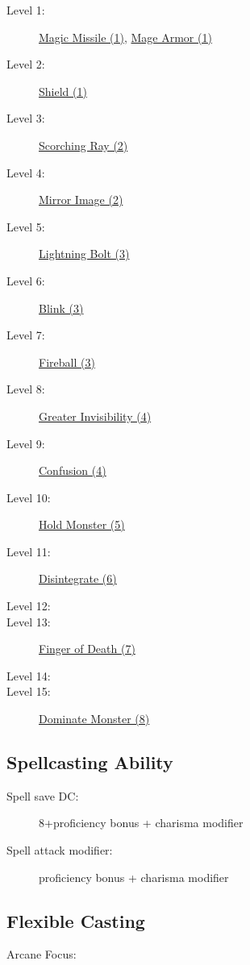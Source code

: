 \documentclass[letterpaper,10pt,twoside,twocolumn,openany]{book}
\begin{document}
\begin{description}
	\item[Level 1:] \hyperlink{Magic Missile}{Magic Missile (1)}, \hyperlink{Mage Armor}{Mage Armor (1)}
	\item[Level 2:] \hyperlink{Shield}{Shield (1)}
	\item[Level 3:] \hyperlink{Scorching Ray}{Scorching Ray (2)}	 
	\item[Level 4:] \hyperlink{Mirror Image}{Mirror Image (2)}
	\item[Level 5:] \hyperlink{Lightning Bolt}{Lightning Bolt (3)}
	\item[Level 6:] \hyperlink{Blink}{Blink (3)}
	\item[Level 7:] \hyperlink{Fireball}{Fireball (3)}
	\item[Level 8:] \hyperlink{Greater Invisibility}{Greater Invisibility (4)}
	\item[Level 9:] \hyperlink{Confusion}{Confusion (4)}
	\item[Level 10:] \hyperlink{Hold Monster}{Hold Monster (5)}
	\item[Level 11:] \hyperlink{Disintegrate}{Disintegrate (6)}
	\item[Level 12:]
	\item[Level 13:] \hyperlink{Finger of Death}{Finger of Death (7)}
	\item[Level 14:] 
	\item[Level 15:] \hyperlink{Dominate Monster}{Dominate Monster (8)}
\end{description}

\subsection{Spellcasting Ability}

\begin{description}
	\item[Spell save DC:] 8+proficiency bonus + charisma modifier
	\item[Spell attack modifier:] proficiency bonus + charisma modifier
\end{description}

\subsection{Flexible Casting}

\begin{description}
	\item[Arcane Focus:]
\end{description}
\end{document}
